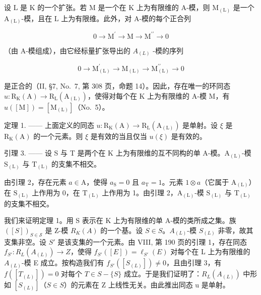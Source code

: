 设 \(\mathrm{L}\) 是 \(\mathrm{K}\) 的一个扩张。若 \(\mathrm{M}\) 是一个在 \(\mathrm{K}\) 上为有限维的 A-模，则 \(\mathrm{M}_{(\mathrm{L})}\) 是一个 \(\mathrm{A}_{(\mathrm{L})}\)-模，且在 \(\mathrm{L}\) 上为有限维。此外，对 A-模的每个正合列

\[
0 \longrightarrow \mathrm{M} ^ {\prime} \longrightarrow \mathrm{M} \longrightarrow \mathrm{M} ^ {\prime \prime} \longrightarrow 0
\]

（由 A-模组成），由它经标量扩张导出的 \(A_{(L)}\) -模的序列

\[
0 \longrightarrow \mathrm{M} _ {(\mathrm{L})} ^ {\prime} \longrightarrow \mathrm{M} _ {(\mathrm{L})} \longrightarrow \mathrm{M} _ {(\mathrm{L})} ^ {\prime \prime} \longrightarrow 0
\]

是正合的（II, §7, No.~7, 第 308 页，命题 14）。因此，存在唯一的环同态 \(u: \mathrm{R}_{\mathrm{K}}(\mathrm{A}) \to \mathrm{R}_{\mathrm{L}}(\mathrm{A}_{(\mathrm{L})})\)，使得对每个在 K 上为有限维的 A-模 M，有 \(u([\mathrm{M}]) = [\mathrm{M}_{(\mathrm{L})}]\)（No.~5）。

定理 1. —— 上面定义的同态 \(u: \mathrm{R}_{\mathrm{K}}(\mathrm{A}) \to \mathrm{R}_{\mathrm{L}}(\mathrm{A}_{(\mathrm{L})})\) 是单射。设 \(\xi\) 是 \(\mathrm{R}_{\mathrm{K}}(\mathrm{A})\) 的一个元素。则 \(\xi\) 是有效的当且仅当 \(u(\xi)\) 是有效的。

引理 3. —— 设 S 与 T 是两个在 K 上为有限维的互不同构的单 A-模。\(\mathrm{A}_{(\mathrm{L})}\)-模 \(\mathrm{S}_{(\mathrm{L})}\) 与 \(\mathrm{T}_{(\mathrm{L})}\) 的支集不相交。

由引理 2，存在元素 \(a \in \mathrm{A}\)，使得 \(a_{\mathrm{S}} = 0\) 且 \(a_{\mathrm{T}} = 1\)。元素 \(1 \otimes a\)（它属于 \(\mathrm{A}_{(\mathrm{L})}\)）在 \(\mathrm{S}_{(\mathrm{L})}\) 上作用为 0，在 \(\mathrm{T}_{(\mathrm{L})}\) 上作用为 1。由引理 2，\(\mathrm{A}_{(\mathrm{L})}\)-模 \(\mathrm{S}_{(\mathrm{L})}\) 与 \(\mathrm{T}_{(\mathrm{L})}\) 的支集不相交。

我们来证明定理 1。用 S 表示在 K 上为有限维的单 A-模的类所成之集。族 \(([S])_{S \in \mathcal{S}}\) 是 Z-模 \(R_{K}(A)\) 的一个基。设 \(S \in S\)。\(A_{(L)}\)-模 \(S_{(L)}\) 非零，故其支集非空。设 \(S'\) 是该支集的一个元素。由 VIII, 第 190 页的引理 1，存在同态 \(f_{S'} : R_L(A_{(L)}) \to Z\)，使得 \(f_{S'}([E]) = \ell_{S'}(E)\) 对每个在 L 上为有限维的 \(A_{(L)}\)-模 E 成立。按构造我们有 \(f_{S'}([S_{(L)}]) \neq 0\)，且由引理 3，有 \(f([T_{(L)}]) = 0\) 对每个 \(T \in S - \{S\}\) 成立。于是我们证明了：\(R_L(A_{(L)})\) 中形如 \([S_{(L)}]\)（\(S \in S\)）的元素在 Z 上线性无关。由此推出同态 u 是单射。

